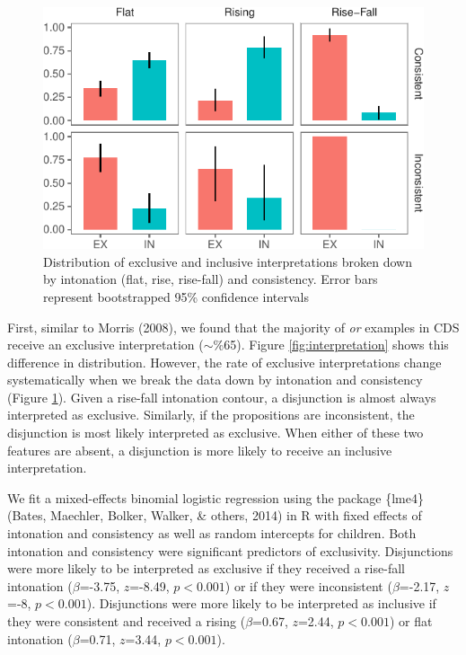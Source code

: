 \documentclass[10pt, letterpaper]{article}
\newenvironment{CodeChunk}{}{}
\begin{document}
\begin{CodeChunk}
\begin{figure}[t]

{\centering \includegraphics{figs/interpretationByIntonationAndConsistency-1} 

}

\caption[Distribution of exclusive and inclusive interpretations broken down by intonation (flat, rise, rise-fall) and consistency]{Distribution of exclusive and inclusive interpretations broken down by intonation (flat, rise, rise-fall) and consistency. Error bars represent bootstrapped 95\% confidence intervals}\label{fig:interpretationByIntonationAndConsistency}
\end{figure}
\end{CodeChunk}

First, similar to Morris (2008), we found that the majority of \emph{or}
examples in CDS receive an exclusive interpretation (\(\sim\)\%65).
Figure \ref{fig:interpretation} shows this difference in distribution.
However, the rate of exclusive interpretations change systematically
when we break the data down by intonation and consistency (Figure
\ref{fig:interpretationByIntonationAndConsistency}). Given a rise-fall
intonation contour, a disjunction is almost always interpreted as
exclusive. Similarly, if the propositions are inconsistent, the
disjunction is most likely interpreted as exclusive. When either of
these two features are absent, a disjunction is more likely to receive
an inclusive interpretation.

We fit a mixed-effects binomial logistic regression using the package
\{lme4\} (Bates, Maechler, Bolker, Walker, \& others, 2014) in R with
fixed effects of intonation and consistency as well as random intercepts
for children. Both intonation and consistency were significant
predictors of exclusivity. Disjunctions were more likely to be
interpreted as exclusive if they received a rise-fall intonation
(\(\beta\)=-3.75, \(z\)=-8.49, \(p < 0.001\)) or if they were
inconsistent (\(\beta\)=-2.17, \(z\)=-8, \(p < 0.001\)). Disjunctions
were more likely to be interpreted as inclusive if they were consistent
and received a rising (\(\beta\)=0.67, \(z\)=2.44, \(p < 0.001\)) or
flat intonation (\(\beta\)=0.71, \(z\)=3.44, \(p < 0.001\)).
\end{document}
